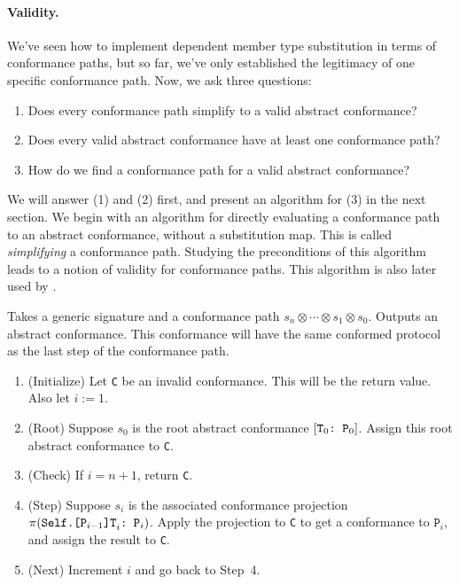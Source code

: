 \documentclass[../generics]{subfiles}
\begin{document}
\paragraph{Validity.} We've seen how to implement dependent member type substitution in terms of conformance paths, but so far, we've only established the legitimacy of one specific conformance path. Now, we ask three questions:
\begin{enumerate}
\item Does every conformance path simplify to a valid abstract conformance?
\item Does every valid abstract conformance have at least one conformance path?
\item How do we find a conformance path for a valid abstract conformance?
\end{enumerate}
We will answer (1) and (2) first, and present an algorithm for (3) in the next section. We begin with an algorithm for directly evaluating a conformance path to an abstract conformance, without a substitution map. This is called \emph{simplifying} a conformance path. Studying the preconditions of this algorithm leads to a notion of validity for conformance paths. This algorithm is also later used by .
\begin{algorithm}\label{invertconformancepath}
Takes a generic signature and a conformance path $s_n\otimes\cdots\otimes s_1\otimes s_0$. Outputs an abstract conformance. This conformance will have the same conformed protocol as the last step of the conformance path.
\begin{enumerate}
\item (Initialize) Let \texttt{C} be an invalid conformance. This will be the return value. Also let $i := 1$.
\item (Root) Suppose $s_0$ is the root abstract conformance $[\texttt{$\texttt{T}_0$:~$\texttt{P}_0$}]$. Assign this root abstract conformance to \texttt{C}.
\item (Check) If $i=n+1$, return \texttt{C}.
\item (Step) Suppose $s_i$ is the associated conformance projection $\pi(\texttt{$\texttt{Self.[$\texttt{P}_{i-1}$]T}_i$:~$\texttt{P}_i$})$. Apply the projection to \texttt{C} to get a conformance to $\texttt{P}_i$, and assign the result to \texttt{C}.
\item (Next) Increment $i$ and go back to Step~4.
\end{enumerate}
\end{algorithm}
\end{document}
